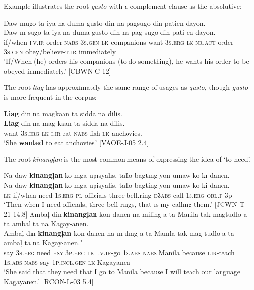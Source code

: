 Example  illustrates the root \textit{gusto} with a complement clause as the absolutive:

\ea
\label{ex:beobeyedimmediately}
Daw mugo ta iya na duma gusto din na pagsugo din patien dayon. \\\smallskip
\gll Daw m-sugo ta iya na duma gusto din na pag-sugo din pati-en dayon. \\
if/when \textsc{i.v.ir}-order	\textsc{nabs}	3\textsc{s.gen}	\textsc{lk}	companions	want
3\textsc{s.erg}	\textsc{lk} 	\textsc{nr.act}-order	3\textsc{s.gen}	obey/believe-\textsc{t.ir}
immediately \\
\glt 'If/When (he) orders his companions (to do something), he wants his order to be obeyed immediately.' [CBWN-C-12]
\z

The root \textit{liag} has approximately the same range of usages as \textit{gusto}, though \textit{gusto} is more frequent in the corpus:

\ea
\label{bkm:Ref122109526}
\textbf{Liag}  din  na  magkaan ta  sidda  na  dilis. \\\smallskip
\gll \textbf{Liag}  din  na  mag-kaan ta  sidda  na  dilis. \\
want  3\textsc{s.erg}  \textsc{lk}  \textsc{i.ir}-eat \textsc{nabs}  fish  \textsc{lk}  anchovies. \\
\glt ‘She \textbf{wanted} to eat anchovies.’ [VAOE-J-05 2.4]
\z

The root \textit{kinangļan} is the most common means of expressing the idea of ‘to need'.

\ea
Na  daw  \textbf{kinangļan}  ko  mga  upisyalis,  tallo  bagting yon  umaw  ko  ki  danen. \\\smallskip
\gll Na  daw  \textbf{kinangļan}  ko  mga  upisyalis,  tallo  bagting yon  umaw  ko  ki  danen. \\
\textsc{lk}  if/when  need  1\textsc{s.erg}  \textsc{pl}  officials  three  bell.ring
\textsc{d3abs}  call  1\textsc{s.erg}  \textsc{obl.p}  3p \\
\glt `Then when I need officials, three bell rings, that is my calling them.’ [JCWN-T-21 14.8]
\z
\ea
Ambaļ  din  \textbf{kinangļan}  kon  danen  na  miling  a  ta  Manila tak  magtudlo  a  ta  ambaļ  ta  na  Kagay-anen. \\\smallskip
\gll Ambaļ  din  \textbf{kinangļan}  kon  danen  na  m-iling  a  ta  Manila tak  mag-tudlo  a  ta  ambaļ  ta  na  Kagay-anen." \\
say  3\textsc{s.erg}  need  \textsc{hsy}  3\textsc{p.erg}  \textsc{lk}  \textsc{i.v.ir}-go  1\textsc{s.abs}  \textsc{nabs}  Manila
because  \textsc{i.ir}-teach  1\textsc{s.abs}  \textsc{nabs}  say  1\textsc{p.incl.gen}  \textsc{lk}  Kagayanen \\
\glt `She said that they need that I go to Manila because I will teach our language Kagayanen.’ [RCON-L-03 5.4]
\z

